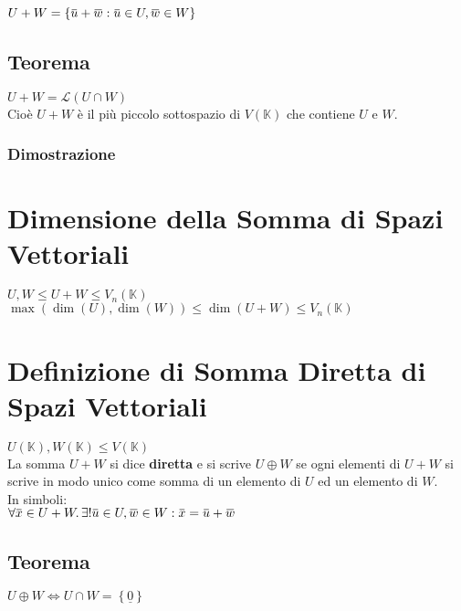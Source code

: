 \documentclass[a4paper, twoside, italian, 11pt]{book}
\newcommand{\braces}[1] {\left \{ #1 \right \}}
\newcommand{\overbar}[1] {\mkern 1.5mu\overline{\mkern-1.5mu#1\mkern-1.5mu}\mkern 1.5mu}
\newcommand{\K}{\mathbb K}
\newcommand{\LS}{\mathcal L}
\begin{document}
\noindent
$U + W = \braces{\overbar u + \overbar w : \overbar u \in U, \overbar w \in W}$


\subsection{Teorema}

$U + W  = \LS (U \cap W)$ \\

\noindent
Cioè $U + W$ è il più piccolo sottospazio di $V(\K)$ che contiene $U$ e $W$.


\subsubsection{Dimostrazione}




\section{Dimensione della Somma di Spazi Vettoriali}

$U, W \leq U + W \leq V_n(\K)$ \\

\noindent
$\max(\dim(U), \dim(W)) \leq \dim(U + W) \leq V_n(\K)$



\section{Definizione di Somma Diretta di Spazi Vettoriali}

$U(\K), W(\K) \leq V(\K)$ \\

\noindent
La somma $U + W$ si dice \textbf{diretta} e si scrive $U \oplus W$ se ogni elementi di $U + W$ si scrive in modo unico come somma di un elemento di $U$ ed un elemento di $W$. \\

\noindent
In simboli: \\

$\forall \overbar x \in U + W \ldotp \exists! \overbar u \in U, \overbar w \in W : \overbar x = \overbar u + \overbar w$


\subsection{Teorema}

$U \oplus W \iff U \cap W = \braces{\underline 0}$ \\
\end{document}
